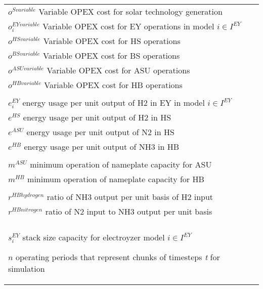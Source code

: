 \documentclass[12 pt]{article}
\begin{document}
\begin{tabular}{ll}
$o^{S variable}$ Variable OPEX cost for solar  technology generation \\
$o^{EY variable}_{i}$ Variable OPEX cost for EY operations in model $i \in I^{EY}$\\
$o^{HS variable}$ Variable OPEX cost for HS operations \\
$o^{BS variable}$ Variable OPEX cost for BS operations \\
$o^{ASU variable}$ Variable OPEX cost for ASU operations \\
$o^{HB variable}$ Variable OPEX cost for HB operations \\
\\
$e^{EY}_{i}$ energy usage per unit output of H2 in EY in model $i \in I^{EY}$\\
$e^{HS}$ energy usage per unit output of H2 in HS \\
$e^{ASU}$ energy usage per unit output of N2 in HS \\
$e^{HB}$ energy usage per unit output of NH3 in HB \\
\\
$m^{ASU}$ minimum operation of nameplate capacity for ASU\\
$m^{HB}$ minimum operation of nameplate capacity for HB\\
\\
$r^{HBhydrogen}$ ratio of NH3 output per unit basis of H2 input\\
$r^{HBnitrogen}$ ratio of N2 input to NH3 output per unit basis\\
\\
$s^{EY}_{i}$ stack size capacity for electroyzer model $i \in I^{EY}$

$n$ operating periods that represent chunks of timesteps \textit{t} for simulation \\

\end{tabular} 
\end{document}
